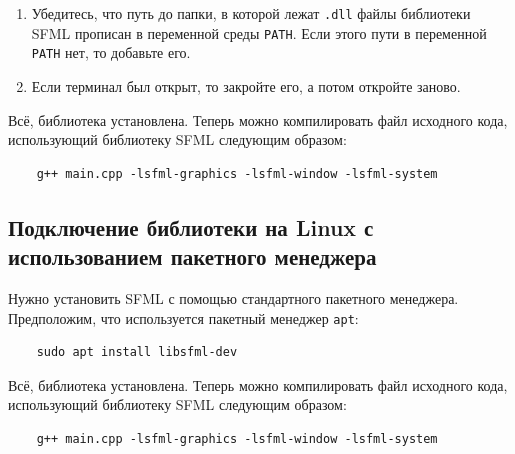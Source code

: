 \documentclass{article}
\begin{document}
\begin{enumerate}
\item Убедитесь, что путь до папки, в которой лежат \texttt{.dll} файлы библиотеки SFML прописан в переменной среды \texttt{PATH}. Если этого пути в переменной \texttt{PATH} нет, то добавьте его.

\item Если терминал был открыт, то закройте его, а потом откройте заново.
\end{enumerate}
Всё, библиотека установлена. Теперь можно компилировать файл исходного кода, использующий библиотеку SFML следующим образом:
\begin{verbatim}
    g++ main.cpp -lsfml-graphics -lsfml-window -lsfml-system
\end{verbatim}



\subsection*{Подключение библиотеки на Linux с использованием пакетного менеджера}
Нужно установить SFML с помощью стандартного пакетного менеджера. Предположим, что используется пакетный менеджер \texttt{apt}:
\begin{verbatim}
    sudo apt install libsfml-dev
\end{verbatim}
Всё, библиотека установлена. Теперь  можно компилировать файл исходного кода, использующий библиотеку SFML следующим образом:
\begin{verbatim}
    g++ main.cpp -lsfml-graphics -lsfml-window -lsfml-system
\end{verbatim}
\end{document}
